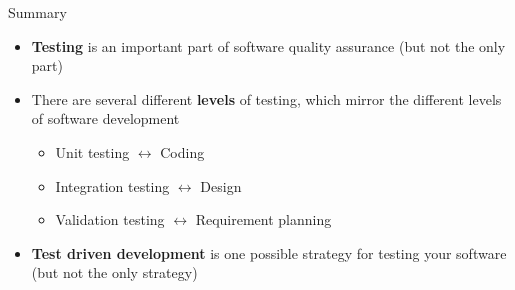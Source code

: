 \begin{frame}{Summary}
    \begin{itemize}
        \item \textbf{Testing} is an important part of software quality assurance (but not the only part)
        \item There are several different \textbf{levels} of testing,
            which mirror the different levels of software development
            \begin{itemize}
                \item Unit testing $\leftrightarrow$ Coding
                \item Integration testing $\leftrightarrow$ Design
                \item Validation testing $\leftrightarrow$ Requirement planning
            \end{itemize}
        \item \textbf{Test driven development} is one possible strategy for testing your software
            (but not the only strategy)
    \end{itemize}
\end{frame}
